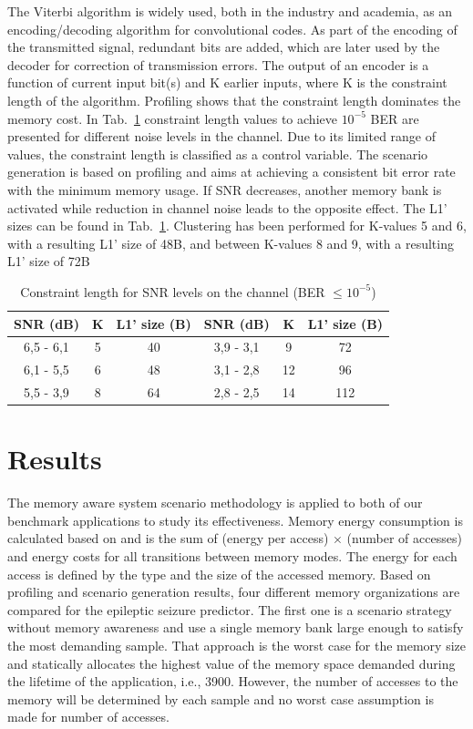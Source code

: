The Viterbi algorithm \cite{viterbi} is widely used, both in the industry and academia, as an encoding/decoding algorithm for convolutional codes. As part of the encoding of the transmitted signal, redundant bits are added, which are later used by the decoder for correction of transmission errors. The output of an encoder is a function of current input bit(s) and K earlier inputs, where K is the constraint length of the algorithm. Profiling shows that the constraint length dominates the memory cost.  In Tab.~\ref{tab:snr} \cite{avd} constraint length values to achieve $ 10^{-5} $ BER are presented for different noise levels in the channel. Due to its limited range of values, the constraint length is classified as a control variable. The scenario generation is based on profiling and aims at achieving a consistent bit error rate with the minimum memory usage. If SNR  decreases, another memory bank is activated while reduction in channel noise leads to the opposite effect. The L1' sizes can be found in Tab.~\ref{tab:snr}. Clustering has been performed for K-values 5 and 6, with a resulting L1' size of 48B, and between K-values 8 and 9, with a resulting L1' size of 72B

\begin{table}[!t]
\caption{Constraint length for SNR levels on the channel (BER $ \leqslant 10^{-5} $)}
\label{tab:snr}
\centering
\begin{tabular}{|c|c|c|c|c|c|}
\hline 
SNR (dB) & K & L1' size (B) & SNR (dB) & K & L1' size (B) \\ 
\hline 
6,5 - 6,1 & 5 & 40 & 3,9 - 3,1 & 9 & 72 \\ 
\hline 
6,1 - 5,5 & 6 & 48 & 3,1 - 2,8 & 12 & 96 \\ 
\hline 
5,5 - 3,9 & 8 & 64 & 2,8 - 2,5 & 14 & 112 \\ 
\hline 
\end{tabular}      
\end{table}
 
\section{Results}
\label{sec:results}

The memory aware system scenario methodology is applied to both of our benchmark applications to study its effectiveness. Memory energy consumption is calculated based on \cite{Artes2011} and is the sum of (energy per access) $ \times $ (number of accesses) and energy costs for all transitions between memory modes. The energy for each access is defined by the type and the size of the accessed memory. Based on profiling and scenario generation results, four different memory organizations are compared for the epileptic seizure predictor. The first one is a scenario strategy without memory awareness and use a single memory bank large enough to satisfy the most demanding sample. That approach is the worst case for the memory size and statically allocates the highest value of the memory space demanded during the lifetime of the application, i.e., 3900. However, the number of accesses to the memory will be determined by each sample and no worst case assumption is made for number of accesses.

